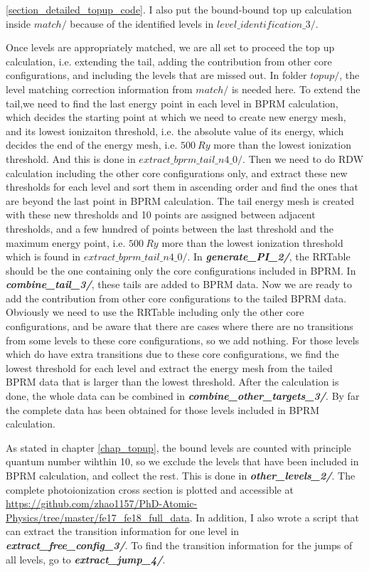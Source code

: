 \ref{section_detailed_topup_code}. I also put the bound-bound top up calculation inside $match/$ because of the identified levels in $level\_identification\_3/$. 

Once levels are appropriately matched, we are all set to proceed the top up calculation, i.e. extending the tail, adding the contribution from other core configurations, and including the levels that are missed out. In folder $topup/$, the level matching correction information from $match/$ is needed here. To extend the tail,we need to find the last energy point in each level in BPRM calculation, which decides the starting point at which we need to create new energy mesh, and its lowest ionizaiton threshold, i.e. the absolute value of its energy, which decides the end of the energy mesh, i.e. $500~Ry$ more than the lowest ionization threshold. And this is done in $extract\_bprm\_tail\_n4\_0/$. Then we need to do RDW calculation including the other core configurations only, and extract these new thresholds for each level and sort them in ascending order and find the ones that are beyond the last point in BPRM calculation. The tail energy mesh is created with these new thresholds and 10 points are assigned between adjacent thresholds, and a few hundred of points between the last threshold and the maximum energy point, i.e.  $500~Ry$ more than the lowest ionization threshold which is found in $extract\_bprm\_tail\_n4\_0/$. In \textbf{\textit{generate\_PI\_2/}}, the RRTable should be the one containing only the core configurations included in BPRM. In \textbf{\textit{combine\_tail\_3/}}, these tails are added to BPRM data. Now we are ready to add the contribution from other core configurations to the tailed BPRM data. Obviously we need to use the RRTable including only the other core configurations, and be aware that there are cases where there are no transitions from some levels to these core configurations, so we add nothing. For those levels which do have extra transitions due to these core configurations, we find the lowest threshold for each level and extract the energy mesh from the tailed BPRM data that is larger than the lowest threshold. After the calculation is done, the whole data can be combined in \textbf{\textit{combine\_other\_targets\_3/}}. By far the complete data has been obtained for those levels included in BPRM calculation. 

As stated in chapter \ref{chap_topup}, the bound levels are counted with principle quantum number wihthin 10, so we exclude the levels that have been included in BPRM calculation, and collect the rest. This is done in \textbf{\textit{other\_levels\_2/}}. The complete photoionization cross section is plotted and accessible at \url{https://github.com/zhao1157/PhD-Atomic-Physics/tree/master/fe17_fe18_full_data}. In addition, I also wrote a script that can extract the transition information for one level in \textbf{\textit{extract\_free\_config\_3/}}. To find the transition information for the jumps of all levels, go to \textbf{\textit{extract\_jump\_4/}}.

